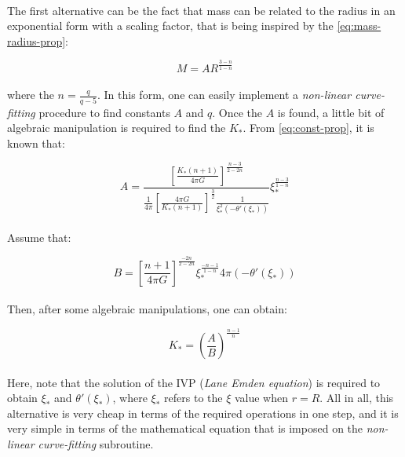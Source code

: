 \documentclass[letterpaper,12pt]{article}
\begin{document}
\paragraph{} The first alternative can be the fact that mass can be related to the radius in an exponential form with a scaling factor, that is being inspired by the \eqref{eq:mass-radius-prop}:

\begin{equation*}
    M = A R^{\frac{3-n}{1-n}}
\end{equation*}

\paragraph{} where the $n = \frac{q}{q-5}$. In this form, one can easily implement a \textit{non-linear curve-fitting} procedure to find constants $A$ and $q$. Once the $A$ is found, a little bit of algebraic manipulation is required to find the $K_*$. From \eqref{eq:const-prop}, it is known that:


\begin{equation*}
   A =\frac{ \left[\frac{K_* \left(n+1\right)}{4 \pi G}\right]^{\frac{n-3}{2 - 2n}} }{\frac{1}{4 \pi} \left[\frac{4 \pi G}{K_* \left(n+1\right)}\right]^{\frac{3}{2}}  \frac{1}{\xi_*^2\left(-\theta'(\xi_*)\right)}} \xi_*^{\frac{n-3}{1-n}}
\end{equation*}

\paragraph{}Assume that:

\begin{equation*}
    B = \left[\frac{n+1}{4\pi G}\right]^{\frac{-2n}{2-2n}} \xi_*^{\frac{-n-1}{1-n}} 4 \pi \left( -\theta'(\xi_*) \right)
\end{equation*}

\paragraph{} Then, after some algebraic manipulations, one can obtain:

\begin{equation*}
    K_* = \left(\frac{A}{B}\right) ^ {\frac{n-1}{n}}
\end{equation*}

\paragraph{} Here, note that the solution of the IVP (\textit{Lane Emden equation}) is required to obtain $\xi_*$ and $\theta'(\xi_*)$, where $\xi_*$ refers to the $\xi$ value when $r = R$. All in all, this alternative is very cheap in terms of the required operations in one step, and it is very simple in terms of the mathematical equation that is imposed on the \textit{non-linear curve-fitting} subroutine.
\end{document}
